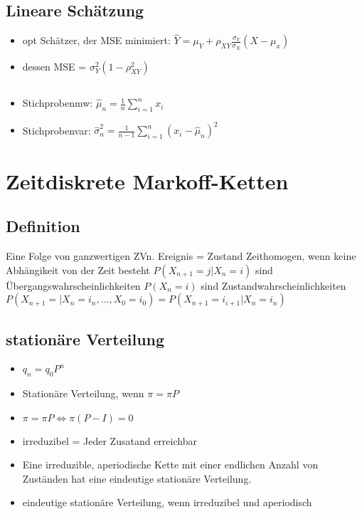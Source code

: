 \documentclass{article}
\begin{document}
\subsection{Lineare Schätzung}
\begin{itemize}
\item opt Schätzer, der MSE minimiert: \newline $\hat{Y} = \mu_Y + \rho_{XY}\frac{\sigma_Y}{\sigma_X} (X-\mu_x) $
\item dessen MSE = $\sigma_Y^2(1-\rho_{XY}^2)$
\end{itemize}

\subsection{}
\begin{itemize}
\item Stichprobenmw: $\hat{\mu}_n = \frac{1}{n} \sum_{i=1}^n x_i$
\item Stichprobenvar: $\hat{\sigma}_n^2 = \frac{1}{n-1} \sum_{i=1}^n(x_i-\hat{\mu}_n)^2$
\end{itemize}


\section{Zeitdiskrete Markoff-Ketten}
\subsection{Definition}

Eine Folge von ganzwertigen ZVn. \newline
Ereignis = Zustand \newline
Zeithomogen, wenn keine Abhängikeit von der Zeit besteht \newline
$P(X_{n+1} = j | X_n = i)$ sind Übergangswahrscheinlichkeiten \newline
$P(X_n = i)$ sind Zustandwahrscheinlichkeiten \newline
$P(X_{n+1} = | X_n = i_n , ..., X_0 = i_0) = P(X_{n+1} = i_{i+1} | X_n = i_n)$


\subsection{station{\"a}re Verteilung}
\begin{itemize}
\item $q_n = q_0 P^n$
\item Station{\"a}re Verteilung, wenn $\pi = \pi P$ 
\item $\pi = \pi P \Leftrightarrow \pi(P - I) = 0$
\item irreduzibel = Jeder Zusatand erreichbar
\item Eine irreduzible, aperiodische Kette mit einer endlichen Anzahl von Zuständen hat eine eindeutige stationäre Verteilung.
\item eindeutige stationäre Verteilung, wenn irreduzibel und aperiodisch
\end{itemize}
\end{document}
